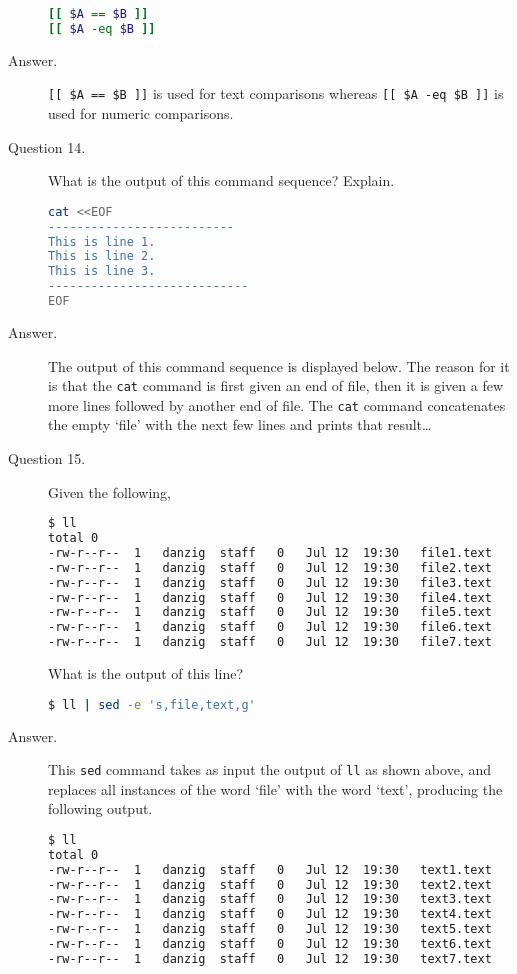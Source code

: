 \documentclass{article}
\begin{document}
\begin{description}
		\begin{lstlisting}[language=bash]
[[ $A == $B ]]
[[ $A -eq $B ]]
		\end{lstlisting}

	\item[Answer.]
		\verb`[[ $A == $B ]]` is used for text comparisons whereas \texttt{[[ \$A -eq \$B ]]} is used for numeric comparisons.

	\item[Question 14.]
		What is the output of this command sequence? Explain.

		\begin{lstlisting}[language=bash]
cat <<EOF
--------------------------
This is line 1.
This is line 2.
This is line 3.
----------------------------
EOF
		\end{lstlisting}

	\item[Answer.]
		The output of this command sequence is displayed below. The reason for it is that the \verb`cat` command is first given an end of file, then it is given a few more lines followed by another end of file. The \verb`cat` command concatenates the empty `file' with the next few lines and prints that result\dots

	\item[Question 15.]
		Given the following,

		\begin{lstlisting}[language=bash]
$ ll
total 0
-rw-r--r--	1	danzig	staff	0	Jul 12	19:30	file1.text
-rw-r--r--	1	danzig	staff	0	Jul 12	19:30	file2.text
-rw-r--r--	1	danzig	staff	0	Jul 12	19:30	file3.text
-rw-r--r--	1	danzig	staff	0	Jul 12	19:30	file4.text
-rw-r--r--	1	danzig	staff	0	Jul 12	19:30	file5.text
-rw-r--r--	1	danzig	staff	0	Jul 12	19:30	file6.text
-rw-r--r--	1	danzig	staff	0	Jul 12	19:30	file7.text
		\end{lstlisting}

		What is the output of this line?

		\begin{lstlisting}[language=bash]
$ ll | sed -e 's,file,text,g'
		\end{lstlisting}

	\item[Answer.]
		This \verb`sed` command takes as input the output of \verb`ll` as shown above, and replaces all instances of the word `file' with the word `text', producing the following output.

		\begin{lstlisting}[language=bash]
$ ll
total 0
-rw-r--r--	1	danzig	staff	0	Jul 12	19:30	text1.text
-rw-r--r--	1	danzig	staff	0	Jul 12	19:30	text2.text
-rw-r--r--	1	danzig	staff	0	Jul 12	19:30	text3.text
-rw-r--r--	1	danzig	staff	0	Jul 12	19:30	text4.text
-rw-r--r--	1	danzig	staff	0	Jul 12	19:30	text5.text
-rw-r--r--	1	danzig	staff	0	Jul 12	19:30	text6.text
-rw-r--r--	1	danzig	staff	0	Jul 12	19:30	text7.text
		\end{lstlisting}


\end{description}
\end{document}

